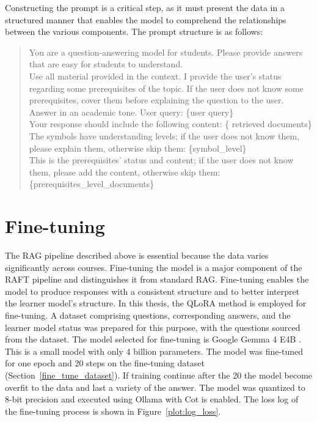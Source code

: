 Constructing the prompt is a critical step, as it must present the data in a structured manner that enables the model to comprehend the relationships between the various components. The prompt structure is as follows:
\begin{quote}
    You are a question-answering model for students. Please provide answers that are easy for students to understand.\\
    Use all material provided in the context.
    I provide the user's status regarding some prerequisites of the topic.
    If the user does not know some prerequisites, cover them before explaining the question to the user.
    Answer in an academic tone.
    User query: \{user query\}\\
    Your response should include the following content:
    \{ retrieved documents\}\\
    The symbols have understanding levels; if the user does not know them, please explain them, otherwise skip them:
    \{symbol\_level\}\\
    This is the prerequisites' status and content; if the user does not know them, please add the content, otherwise skip them:\\
    \{prerequisites\_level\_documents\}
\end{quote}

\section{Fine-tuning}

The RAG pipeline described above is essential because the data varies significantly across courses. Fine-tuning the model is a major component of the RAFT pipeline and distinguishes it from standard RAG.
Fine-tuning enables the model to produce responses with a consistent structure and to better interpret the learner model's structure.
In this thesis, the QLoRA method is employed for fine-tuning.
A dataset comprising questions, corresponding answers, and the learner model status was prepared for this purpose, with the questions sourced from the dataset.
The model selected for fine-tuning is Google Gemma 4 E4B \cite{gemmateam2026gemma4technicalreport}.
This is a small model with only 4 billion parameters.
The model was fine-tuned for one epoch and 20 steps on the fine-tuning dataset (Section~\ref{fine_tune_dataset}). If training continue after the 20 the model become overfit to the data and last a variety of the answer.
The model was quantized to 8-bit precision and executed using Ollama with Cot is enabled. The loss log of the fine-tuning process is shown in Figure~\ref{plot:log_loss}.

